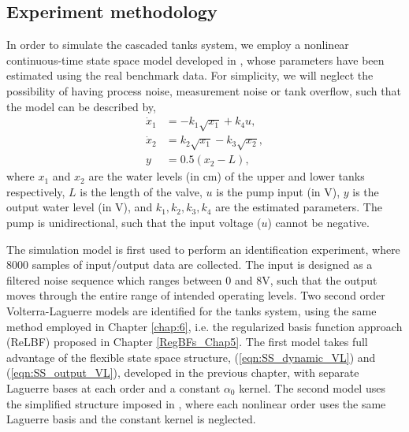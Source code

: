 \subsection{Experiment methodology}

In order to simulate the cascaded tanks system, we employ a nonlinear continuous-time state space model developed in \cite{Pan2018}, whose parameters have been estimated using the real benchmark data. For simplicity, we will neglect the possibility of having process noise, measurement noise or tank overflow, such that the model can be described by,
\begin{align}
\dot{x}_1 &= -k_1 \sqrt{x_1} + k_4 u, \\
\dot{x}_2 &= k_2 \sqrt{x_1} - k_3 \sqrt{x_2}, \\
y &= 0.5(x_2 - L),
\end{align}
where $x_1$ and $x_2$ are the water levels (in cm) of the upper and lower tanks respectively, $L$ is the length of the valve, $u$ is the pump input (in V), $y$ is the output water level (in V), and $k_1, k_2, k_3, k_4$ are the estimated parameters. The pump is unidirectional, such that the input voltage ($u$) cannot be negative.

The simulation model is first used to perform an identification experiment, where $8000$ samples of input/output data are collected. The input is designed as a filtered noise sequence which ranges between 0 and 8V, such that the output moves through the entire range of intended operating levels. Two second order Volterra-Laguerre models are identified for the tanks system, using the same method employed in Chapter \ref{chap:6}, i.e. the regularized basis function approach (ReLBF) proposed in Chapter \ref{RegBFs_Chap5}. The first model takes full advantage of the flexible state space structure, (\ref{eqn:SS_dynamic_VL}) and (\ref{eqn:SS_output_VL}), developed in the previous chapter, with separate Laguerre bases at each order and a constant $\alpha_0$ kernel. The second model uses the simplified structure imposed in \cite{Parker1998}, where each nonlinear order uses the same Laguerre basis and the constant kernel is neglected. 

